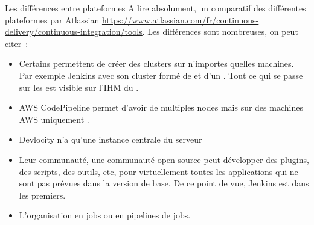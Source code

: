 \documentclass{beamer}
\begin{document}
    \begin{frame}{Les différences entre plateformes}
        \transdissolve
        A lire absolument, un comparatif des différentes plateformes par Atlassian \url{https://www.atlassian.com/fr/continuous-delivery/continuous-integration/tools}.
        \bigbreak
        Les différences sont nombreuses, on peut citer~:
        \begin{itemize}
            \item Certains permettent de créer des clusters sur n'importes quelles machines.
            Par exemple Jenkins avec son cluster formé de  et d'un .
            Tout ce qui se passe sur les  est visible sur l'IHM du .
            \item AWS CodePipeline permet d'avoir de multiples nodes mais sur des machines AWS uniquement .
            \item Devlocity n'a qu'une instance centrale du serveur
            \item Leur communauté, une communauté open source peut développer des plugins, des scripts, des outils, etc, pour virtuellement toutes les applications qui ne sont pas prévues dans la version de base.
            De ce point de vue, Jenkins est dans les premiers.
            \item L'organisation en jobs ou en pipelines de jobs.
        \end{itemize}
    \end{frame}
\end{document}

